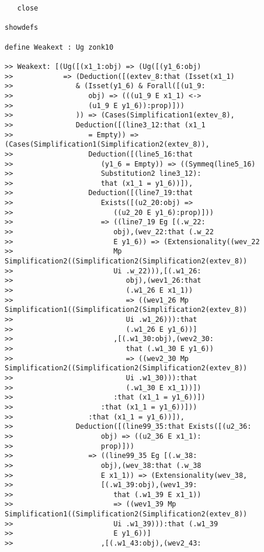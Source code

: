 \documentclass{article}
\begin{document}
{\begin{verbatim}
   close

showdefs

define Weakext : Ug zonk10

>> Weakext: [(Ug([(x1_1:obj) => (Ug([(y1_6:obj)
>>            => (Deduction([(extev_8:that (Isset(x1_1)
>>               & (Isset(y1_6) & Forall([(u1_9:
>>                  obj) => (((u1_9 E x1_1) <->
>>                  (u1_9 E y1_6)):prop)]))
>>               )) => (Cases(Simplification1(extev_8),
>>               Deduction([(line3_12:that (x1_1
>>                  = Empty)) => (Cases(Simplification1(Simplification2(extev_8)),
>>                  Deduction([(line5_16:that
>>                     (y1_6 = Empty)) => ((Symmeq(line5_16)
>>                     Substitution2 line3_12):
>>                     that (x1_1 = y1_6))]),
>>                  Deduction([(line7_19:that
>>                     Exists([(u2_20:obj) =>
>>                        ((u2_20 E y1_6):prop)]))
>>                     => ((line7_19 Eg [(.w_22:
>>                        obj),(wev_22:that (.w_22
>>                        E y1_6)) => (Extensionality((wev_22
>>                        Mp Simplification2((Simplification2(Simplification2(extev_8))
>>                        Ui .w_22))),[(.w1_26:
>>                           obj),(wev1_26:that
>>                           (.w1_26 E x1_1))
>>                           => ((wev1_26 Mp Simplification1((Simplification2(Simplification2(extev_8))
>>                           Ui .w1_26))):that
>>                           (.w1_26 E y1_6))]
>>                        ,[(.w1_30:obj),(wev2_30:
>>                           that (.w1_30 E y1_6))
>>                           => ((wev2_30 Mp Simplification2((Simplification2(Simplification2(extev_8))
>>                           Ui .w1_30))):that
>>                           (.w1_30 E x1_1))])
>>                        :that (x1_1 = y1_6))])
>>                     :that (x1_1 = y1_6))]))
>>                  :that (x1_1 = y1_6))]),
>>               Deduction([(line99_35:that Exists([(u2_36:
>>                     obj) => ((u2_36 E x1_1):
>>                     prop)]))
>>                  => ((line99_35 Eg [(.w_38:
>>                     obj),(wev_38:that (.w_38
>>                     E x1_1)) => (Extensionality(wev_38,
>>                     [(.w1_39:obj),(wev1_39:
>>                        that (.w1_39 E x1_1))
>>                        => ((wev1_39 Mp Simplification1((Simplification2(Simplification2(extev_8))
>>                        Ui .w1_39))):that (.w1_39
>>                        E y1_6))]
>>                     ,[(.w1_43:obj),(wev2_43:

\end{verbatim}}
\end{document}
